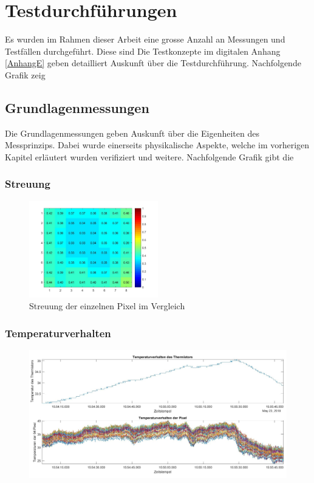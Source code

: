\chapter{Testdurchführungen}
\label{chap:Testphasen}

Es wurden im Rahmen dieser Arbeit eine grosse Anzahl an Messungen und Testfällen durchgeführt. Diese sind 
Die Testkonzepte im digitalen Anhang \ref{AnhangE} geben detailliert Auskunft über die Testdurchführung. Nachfolgende Grafik zeig

\section{Grundlagenmessungen}

Die Grundlagenmessungen geben Auskunft über die Eigenheiten des Messprinzips. Dabei wurde einerseits physikalische Aspekte, welche im vorherigen Kapitel erläutert wurden verifiziert und weitere.
Nachfolgende Grafik gibt die    



\subsection{Streuung}

\begin{figure}[H]
	\centering
	\includegraphics[width=0.5\textwidth]
	{fig/Distanz_140cm_std_.jpg}
	\caption[Streuung der einzelnen Pixel im Vergleich]{Streuung der einzelnen Pixel im Vergleich}
	\label{fig:Streuung}
\end{figure}


\subsection{Temperaturverhalten}

\begin{figure}
	\centering
	\includegraphics[width=1.0\textwidth]{fig/Temperaturverhalten2}
	\caption{}
	\label{fig:temperaturverhalten2}
\end{figure}



